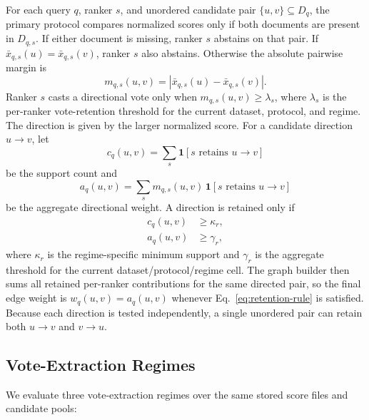 \documentclass[manuscript,anonymous,review]{acmart}
\begin{document}
For each query $q$, ranker $s$, and unordered candidate pair $\{u,v\}
\subseteq D_q$, the primary protocol compares normalized scores only if both
documents are present in $D_{q,s}$. If either document is missing, ranker $s$
abstains on that pair. If $\bar{x}_{q,s}(u) = \bar{x}_{q,s}(v)$, ranker $s$
also abstains. Otherwise the absolute pairwise margin is
\begin{equation}
  m_{q,s}(u,v) = \left| \bar{x}_{q,s}(u) - \bar{x}_{q,s}(v) \right|.
  \label{eq:pair-margin}
\end{equation}
Ranker $s$ casts a directional vote only when $m_{q,s}(u,v) \ge \lambda_s$,
where $\lambda_s$ is the per-ranker vote-retention threshold for the current
dataset, protocol, and regime. The direction is given by the larger normalized
score. For a candidate direction $u \rightarrow v$, let
\begin{equation}
  c_q(u,v) = \sum_{s} \mathbf{1}\!\left[s \text{ retains } u \rightarrow v\right]
  \label{eq:support-count}
\end{equation}
be the support count and
\begin{equation}
  a_q(u,v) = \sum_{s} m_{q,s}(u,v)\,
  \mathbf{1}\!\left[s \text{ retains } u \rightarrow v\right]
  \label{eq:aggregate-weight}
\end{equation}
be the aggregate directional weight. A direction is retained only if
\begin{equation}
  \begin{aligned}
    c_q(u,v) &\ge \kappa_r, \\
    a_q(u,v) &\ge \gamma_r,
  \end{aligned}
  \label{eq:retention-rule}
\end{equation}
where $\kappa_r$ is the regime-specific minimum support and $\gamma_r$ is the
aggregate threshold for the current dataset/protocol/regime cell. The graph
builder then sums all retained per-ranker contributions for the same directed
pair, so the final edge weight is $w_q(u,v)=a_q(u,v)$ whenever
Eq.~\eqref{eq:retention-rule} is satisfied. Because each direction is tested
independently, a single unordered pair can retain both $u \rightarrow v$ and
$v \rightarrow u$.

\subsection{Vote-Extraction Regimes}
\label{sec:regimes}

We evaluate three vote-extraction regimes over the same stored score files and
candidate pools:
\end{document}
